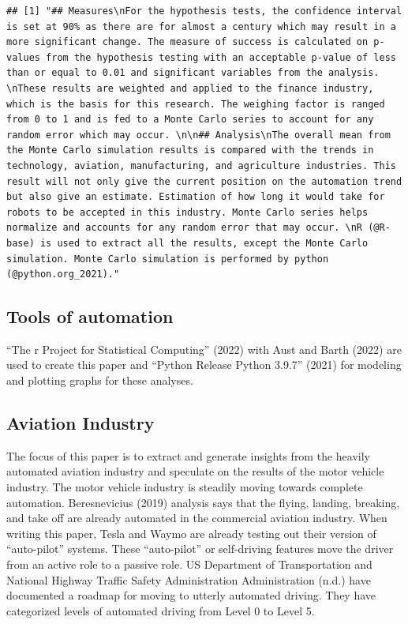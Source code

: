 \documentclass[
  man,floatsintext]{apa7}
\begin{document}
\begin{verbatim}
## [1] "## Measures\nFor the hypothesis tests, the confidence interval is set at 90% as there are for almost a century which may result in a more significant change. The measure of success is calculated on p-values from the hypothesis testing with an acceptable p-value of less than or equal to 0.01 and significant variables from the analysis. \nThese results are weighted and applied to the finance industry, which is the basis for this research. The weighing factor is ranged from 0 to 1 and is fed to a Monte Carlo series to account for any random error which may occur. \n\n## Analysis\nThe overall mean from the Monte Carlo simulation results is compared with the trends in technology, aviation, manufacturing, and agriculture industries. This result will not only give the current position on the automation trend but also give an estimate. Estimation of how long it would take for robots to be accepted in this industry. Monte Carlo series helps normalize and accounts for any random error that may occur. \nR (@R-base) is used to extract all the results, except the Monte Carlo simulation. Monte Carlo simulation is performed by python (@python.org_2021)."
\end{verbatim}

\hypertarget{tools-of-automation}{%
\subsection{Tools of automation}\label{tools-of-automation}}

{``The r Project for Statistical Computing''} (2022) with Aust and Barth (2022) are used to create this paper and {``Python Release Python 3.9.7''} (2021) for modeling and plotting graphs for these analyses.\\

\hypertarget{aviation-industry}{%
\subsection{Aviation Industry}\label{aviation-industry}}

The focus of this paper is to extract and generate insights from the heavily automated aviation industry and speculate on the results of the motor vehicle industry. The motor vehicle industry is steadily moving towards complete automation. Beresnevicius (2019) analysis says that the flying, landing, breaking, and take off are already automated in the commercial aviation industry. When writing this paper, Tesla and Waymo are already testing out their version of ``auto-pilot'' systems. These ``auto-pilot'' or self-driving features move the driver from an active role to a passive role. US Department of Transportation and National Highway Traffic Safety Administration Administration (n.d.) have documented a roadmap for moving to utterly automated driving. They have categorized levels of automated driving from Level 0 to Level 5.\\
\end{document}
